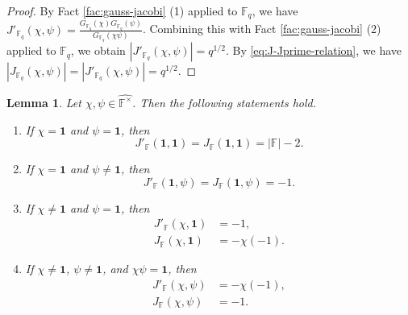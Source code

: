 \documentclass[10pt,a4paper]{article}
\newtheorem{lem}[thm]{Lemma}
\newcommand{\one}{\mathbf{1}}
\numberwithin{equation}{section}
\begin{document}
\begin{proof}
By Fact \ref{fac:gauss-jacobi} \textup{(1)} applied to $\mathbb{F}_q$, we have
$J'_{\mathbb{F}_q}(\chi,\psi)=\frac{G_{\mathbb{F}_q}(\chi)G_{\mathbb{F}_q}(\psi)}{G_{\mathbb{F}_q}(\chi\psi)}$.
Combining this with Fact \ref{fac:gauss-jacobi} \textup{(2)} applied to $\mathbb{F}_q$, we obtain
$|J'_{\mathbb{F}_q}(\chi,\psi)|=q^{1/2}$.
By \eqref{eq:J-Jprime-relation}, we have
$|J_{\mathbb{F}_q}(\chi,\psi)|=|J'_{\mathbb{F}_q}(\chi,\psi)|=q^{1/2}$.
\end{proof}

\begin{lem}\label{lem:jacobi-special-values}
Let $\chi,\psi\in\widehat{\mathbb{F}^{\times}}$. Then the following statements hold.
\begin{enumerate}[label=\textup{(\arabic*)},leftmargin=2.5em]
\item If $\chi=\one$ and $\psi=\one$, then
\begin{equation}\label{eq:jacobi-special-trivial-trivial}
J'_{\mathbb{F}}(\one,\one)=J_{\mathbb{F}}(\one,\one)=|\mathbb{F}|-2.
\end{equation}

\item If $\chi=\one$ and $\psi\neq\one$, then
\begin{equation}\label{eq:jacobi-special-left-trivial}
J'_{\mathbb{F}}(\one,\psi)=J_{\mathbb{F}}(\one,\psi)=-1.
\end{equation}

\item If $\chi\neq\one$ and $\psi=\one$, then
\begin{subequations}
\begin{align}
J'_{\mathbb{F}}(\chi,\one)&=-1,\label{eq:jacobi-special-right-trivial-Jprime}\\
J_{\mathbb{F}}(\chi,\one)&=-\chi(-1).\label{eq:jacobi-special-right-trivial-J}
\end{align}
\end{subequations}

\item If $\chi\neq\one$, $\psi\neq\one$, and $\chi\psi=\one$, then
\begin{subequations}
\begin{align}
J'_{\mathbb{F}}(\chi,\psi)&=-\chi(-1),\label{eq:jacobi-special-inverse-Jprime}\\
J_{\mathbb{F}}(\chi,\psi)&=-1.\label{eq:jacobi-special-inverse-J}
\end{align}
\end{subequations}
\end{enumerate}
\end{lem}
\end{document}
